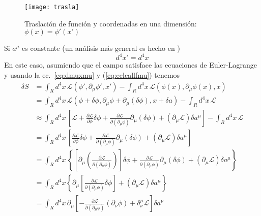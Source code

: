 \begin{frame}
\begin{figure} %
  \centering %
  \texttt{[image: trasla]} %
  \caption{Traslaci\'on de funci\'on y coordenadas en una dimensi\'on: $\phi(x)=\phi'(x')$ } %
  \label{fig:trasla} %
\end{figure} %
Si $a^\mu$ es constante (un an\'alisis m\'as general es hecho en \cite{r})
\begin{equation}
  d^4x'=d^4x
\end{equation}
En este caso, asumiendo que el campo satisface las ecuaciones de
Euler-Lagrange y usando la ec.~\eqref{eq:dmuxmu} y (\ref{eq:eelcallfmu}) tenemos
\begin{align}
  \delta S&=\int_{R}d^4x\,\mathcal{L}(\phi',\partial_\mu\phi',x')-\int_{R}d^4x\,\mathcal{L}(\phi(x),\partial_\mu\phi(x),x)\nonumber\\
  &=\int_{R}d^4x\,\mathcal{L}(\phi+\delta\phi,\partial_\mu\phi+\partial_\mu(\delta\phi),x+\delta a)-\int_{R}d^4x\,\mathcal{L}\nonumber\\
  &\approx\int_{R}d^4x\,
  \left[\mathcal{L}+
    \frac{\partial\mathcal{L}}{\partial\phi}\delta\phi+\frac{\partial\mathcal{L}}{\partial(\partial_\mu\phi)}\partial_\mu(\delta\phi)+
    (\partial_\mu\mathcal{L})\delta a^\mu\right]-\int_{R}d^4x\,\mathcal{L}\nonumber\\
  &=\int_{R}d^4x\,
  \left[
    \frac{\partial\mathcal{L}}{\partial\phi}\delta\phi+\frac{\partial\mathcal{L}}{\partial(\partial_\mu\phi)}\partial_\mu(\delta\phi)+
    (\partial_\mu\mathcal{L})\delta a^\mu\right]\nonumber\\
  &=\int_{R}d^4x\,
  \left\{ 
    \left[\partial_\mu\left(\frac{\partial\mathcal{L}}{\partial(\partial_\mu\phi)}
    \right)\right]\delta\phi+\frac{\partial\mathcal{L}}{\partial(\partial_\mu\phi)}\partial_\mu(\delta\phi)+
    (\partial_\mu\mathcal{L})\delta a^\mu\right\}\nonumber\\
  &=\int_{R}d^4x\left\{ 
    \partial_\mu\left[\frac{\partial\mathcal{L}}{\partial(\partial_\mu\phi)}\delta\phi\right]
  +(\partial_\mu\mathcal{L})\delta a^\mu\right\}\nonumber\\
  &=\int_{R}d^4x\,
    \partial_\mu\left[
      -\frac{\partial\mathcal{L}}{\partial(\partial_\mu\phi)}(\partial_\nu\phi)
      +\delta^\mu_\nu\mathcal{L}
    \right]\delta a^\nu\nonumber\\
    \label{eq:2}

\end{align}
\end{frame}
